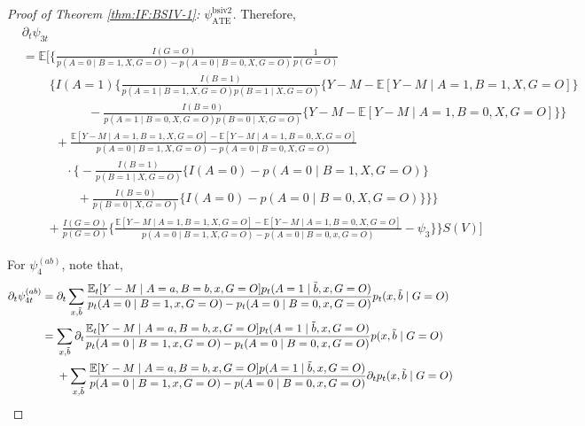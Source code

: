 \documentclass[10pt]{article}
\begin{document}
\begin{proof}[Proof of Theorem \ref{thm:IF:BSIV-1}: $\psi_{\text{ATE}}^{\text{bsiv2}}$]
Therefore,
{\footnotesize \begin{align*}
    &\partial_t\psi_{3t}\\
    &=\mathbb{E}\Bigg[\Bigg\{\frac{I(G=O)}{p(A=0\mid B=1,X,G=O)-p(A=0\mid B=0,X,G=O)}\frac{1}{p(G=O)}\\
    &\ \ \ \ \ \ \ \ \ \ \bigg\{I(A=1)\big\{\frac{I(B=1)}{p(A=1\mid B=1,X,G=O)p(B=1\mid X,G=O)}\{Y-M-\mathbb{E}[Y-M\mid A=1,B=1,X,G=O]\}\\
    &\ \ \ \ \ \ \ \ \ \ \ \ \ \ \ \ \ \ \ \ \ \ \ \ -\frac{I(B=0)}{p(A=1\mid B=0,X,G=O)p(B=0\mid X,G=O)}\{Y-M-\mathbb{E}[Y-M\mid A=1,B=0,X,G=O]\}\big\}\\
    &\ \ \ \ \ \ \ \ \ \ \ \ +\frac{\mathbb{E}[Y-M\mid A=1,B=1,X,G=O]-\mathbb{E}[Y-M\mid A=1,B=0,X,G=O]}{p(A=0\mid B=1,X,G=O)-p(A=0\mid B=0,X,G=O)}\\
    &\ \ \ \ \ \ \ \ \ \ \ \ \ \ \ \ \cdot\big\{-\frac{I(B=1)}{p(B=1\mid X, G=O)}\{I(A=0)-p(A=0\mid B=1,X,G=O)\}\\
    &\ \ \ \ \ \ \ \ \ \ \ \ \ \ \ \ \ \ \ \ +\frac{I(B=0)}{p(B=0\mid X, G=O)}\{I(A=0)-p(A=0\mid B=0,X,G=O)\}\big\}\bigg\}\\
    &\ \ \ \ \ \ \ \ \  +\frac{I(G=O)}{p(G=O)}\bigg\{\frac{\mathbb{E}[Y-M\mid A=1,B=1,X,G=O]-\mathbb{E}[Y-M\mid A=1,B=0,X,G=O]}{p(A=0\mid B=1,X,G=O)-p(A=0\mid B=0,x,G=O)}-\psi_3\bigg\}\Bigg\}S(V)\Bigg]
\end{align*}}

 For $\psi_4^{(ab)}$, note that,
 \begin{align*}
     \partial_t\psi_{4t}^{(ab)}&=\partial_t\sum_{x,\Tilde{b}}\frac{\mathbb{E}_t[Y-M\mid A=a,B=b,x,G=O]p_t(A=1\mid \Tilde{b},x,G=O)}{p_t(A=0\mid B=1,x,G=O)-p_t(A=0\mid B=0,x,G=O)}p_t(x,\Tilde{b}\mid G=O)\\
     &=\sum_{x,\Tilde{b}}\partial_t\frac{\mathbb{E}_t[Y-M\mid A=a,B=b,x,G=O]p_t(A=1\mid \Tilde{b},x,G=O)}{p_t(A=0\mid B=1,x,G=O)-p_t(A=0\mid B=0,x,G=O)}p(x,\Tilde{b}\mid G=O)\\
     &\ \ \ \ +\sum_{x,\Tilde{b}}\frac{\mathbb{E}[Y-M\mid A=a,B=b,x,G=O]p(A=1\mid \Tilde{b},x,G=O)}{p(A=0\mid B=1,x,G=O)-p(A=0\mid B=0,x,G=O)}\partial_tp_t(x,\Tilde{b}\mid G=O)
 \end{align*}


\end{proof}
\end{document}

